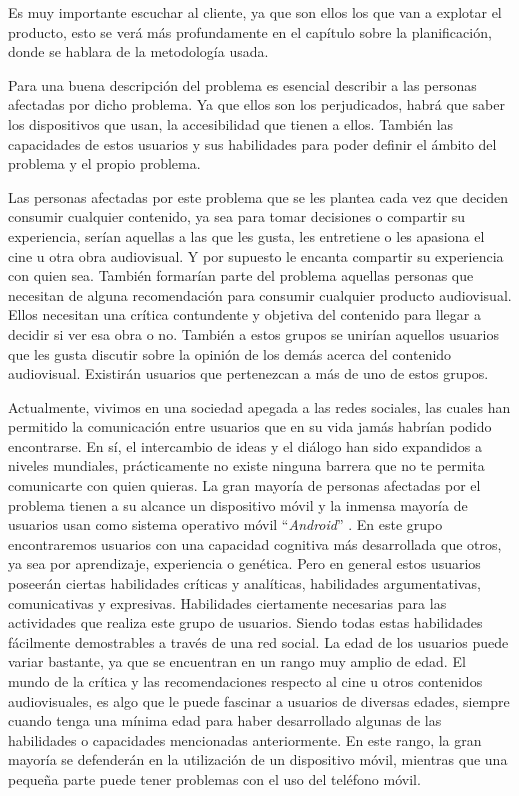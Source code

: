 Es muy importante escuchar al cliente, ya que son ellos los que van a explotar el producto, esto se 
verá más profundamente en el capítulo sobre la planificación, donde se hablara de la metodología usada.

Para una buena descripción del problema es esencial describir a las personas afectadas por dicho 
problema. Ya que ellos son los perjudicados, habrá que saber los dispositivos que usan, la 
accesibilidad que tienen a ellos. También las capacidades de estos usuarios y sus habilidades para 
poder definir el ámbito del problema y el propio problema.

Las personas afectadas por este problema que se les plantea cada vez que deciden consumir cualquier
contenido, ya sea para tomar decisiones o compartir su experiencia, serían aquellas a las que les 
gusta, les entretiene o les apasiona el cine u otra obra audiovisual. Y por supuesto le encanta 
compartir su experiencia con quien sea. También formarían parte del problema aquellas personas que 
necesitan de alguna recomendación para consumir cualquier producto audiovisual. Ellos necesitan una 
crítica contundente y objetiva del contenido para llegar a decidir si ver esa obra o no. También a 
estos grupos se unirían aquellos usuarios que les gusta discutir sobre la opinión de los demás acerca 
del contenido audiovisual. Existirán usuarios que pertenezcan a más de uno de estos grupos.

Actualmente, vivimos en una sociedad apegada a las redes sociales, las cuales han permitido la 
comunicación entre usuarios que en su vida jamás habrían podido encontrarse. En sí, el intercambio de 
ideas y el diálogo han sido expandidos a niveles mundiales, prácticamente no existe ninguna barrera
que no te permita comunicarte con quien quieras. La gran mayoría de personas afectadas por el problema 
tienen a su alcance un dispositivo móvil y la inmensa mayoría de usuarios usan como sistema operativo 
móvil ``\textit{Android}'' \cite{OSmobile}. En este grupo encontraremos usuarios con una capacidad 
cognitiva más desarrollada que otros, ya sea por aprendizaje, experiencia o genética. Pero en general 
estos usuarios poseerán ciertas habilidades críticas y analíticas, habilidades argumentativas, 
comunicativas y expresivas. Habilidades ciertamente necesarias para las actividades que realiza este 
grupo de usuarios. Siendo todas estas habilidades fácilmente demostrables a través de  una red social. 
La edad de los usuarios puede variar bastante, ya que se encuentran en un rango muy amplio de edad. El 
mundo de la crítica y las recomendaciones respecto al cine u otros contenidos audiovisuales, es algo 
que le puede fascinar a usuarios de diversas edades, siempre cuando tenga una mínima 
edad para haber desarrollado algunas de las habilidades o capacidades mencionadas anteriormente. En
este rango, la gran mayoría se defenderán en la utilización de un dispositivo móvil, mientras que una 
pequeña parte puede tener problemas con el uso del teléfono móvil.

